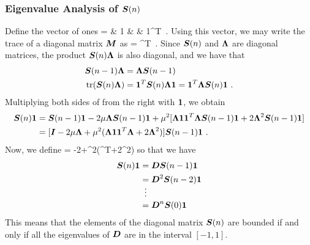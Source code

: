 \subsubsection{Eigenvalue Analysis of $\boldsymbol{S}(n)$}
Define the vector of ones
\bmath
   =  & 1 & \cdots & 1\ebmtx^T\ .
\emath
Using this vector, we may write the trace of a diagonal matrix $\boldsymbol{M}$ as
\bmath
   = ^T\ .
\emath
Since $\boldsymbol{S}(n)$ and $\boldsymbol{\Lambda}$ are diagonal matrices, the product $\boldsymbol{S}(n)\boldsymbol{\Lambda}$ is also diagonal, and we have that
\begin{align}
  \boldsymbol{S}(n-1)\boldsymbol{\Lambda} &= \boldsymbol{\Lambda}\boldsymbol{S}(n-1)\\
  \textup{tr}(\boldsymbol{S}(n)\boldsymbol{\Lambda}) &= \boldsymbol{1}^T\boldsymbol{S}(n)\boldsymbol{\Lambda 1} = \boldsymbol{1}^T\boldsymbol{\Lambda}\boldsymbol{S}(n)\boldsymbol{1}\ .
  \label{eq:app_lms_tr_diag}
\end{align}
Multiplying both sides of  from the right with $\boldsymbol{1}$, we obtain
\begin{align}
  \vect{S}(n)\vect{1} &= \vect{S}(n-1)\vect{1} - 2\mu\vect{\Lambda}\vect{S}(n-1)\vect{1}+\mu^2[\vect{\Lambda}\vect{1}\vect{1}^T\vect{\Lambda}\vect{S}(n-1)\vect{1}+2\vect{\Lambda}^2\vect{S}(n-1)\vect{1}]\\
  &= [\vect{I}-2\mu\vect{\Lambda}+\mu^2(\vect{\Lambda}\vect{1}\vect{1}^T\vect{\Lambda}+2\vect{\Lambda}^2)]\vect{S}(n-1)\vect{1}\ .
\end{align}
Now, we define
\bmath
   = -2\mu\vect{\Lambda}+\mu^2(\vect{\Lambda}^T\vect{\Lambda}+2\vect{\Lambda}^2)
  \label{eq:app_lms_D}
\emath
so that we have
\begin{align}
  \boldsymbol{S}(n)\boldsymbol{1} &= \boldsymbol{D}\boldsymbol{S}(n-1)\boldsymbol{1}\\
  &\underset{\vdots}{=} \boldsymbol{D}^2\boldsymbol{S}(n-2)\boldsymbol{1}\\
  & = \boldsymbol{D}^n\boldsymbol{S}(0)\boldsymbol{1}
  \label{eq:app_lms_S_D_recur}
\end{align}
This means that the elements of the diagonal matrix $\boldsymbol{S}(n)$ are bounded if and only if all the eigenvalues of $\boldsymbol{D}$ are in the interval $[-1,1]$.

